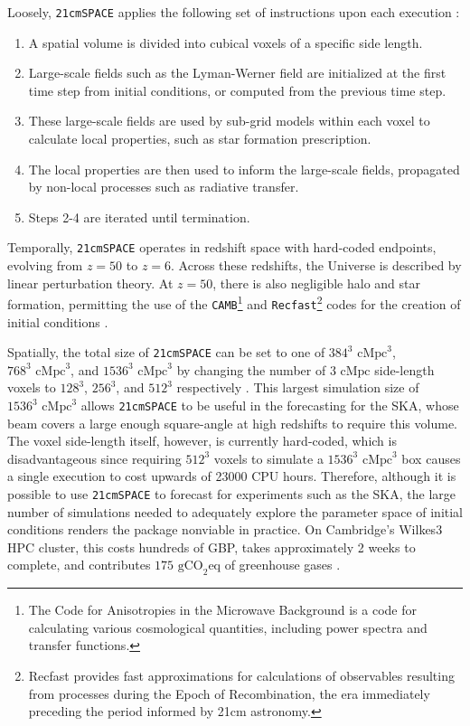 \documentclass[floats,floatfix,showpacs,amssymb,prd,superscriptaddress,nofootinbib]{revtex4-2} %
\newcommand{\code}{\texttt}
\begin{document}
Loosely, \code{21cmSPACE} applies the following set of instructions upon each execution \citep{gessey-jones_thesis}:

\begin{enumerate}
    \item A spatial volume is divided into cubical voxels of a specific side length.

    \item Large-scale fields such as the Lyman-Werner field are initialized at the first time step from initial conditions, or computed from the previous time step.

    \item These large-scale fields are used by sub-grid models within each voxel to calculate local properties, such as star formation prescription.

    \item The local properties are then used to inform the large-scale fields, propagated by non-local processes such as radiative transfer.

    \item Steps 2-4 are iterated until termination.
\end{enumerate}

Temporally, \code{21cmSPACE} operates in redshift space with hard-coded endpoints, evolving from $z = 50$ to $z = 6$. Across these redshifts, the Universe is described by linear perturbation theory. At $z = 50$, there is also negligible halo and star formation, permitting the use of the \code{CAMB}\footnote{The Code for Anisotropies in the Microwave Background is a code for calculating various cosmological quantities, including power spectra and transfer functions.}\citep{Lewis_Challinor_2011} and \code{Recfast}\footnote{Recfast provides fast approximations for calculations of observables resulting from processes during the Epoch of Recombination, the era immediately preceding the period informed by 21cm astronomy.}\citep{Seager_2011} codes for the creation of initial conditions \citep{gessey-jones_thesis}.

Spatially, the total size of \code{21cmSPACE} can be set to one of $384^3 \text{ cMpc}^3$, $768^3 \text{ cMpc}^3$, and $1536^3 \text{ cMpc}^3$ by changing the number of $3 \text{ cMpc}$ side-length voxels to $128^3$, $256^3$, and $512^3$ respectively \citep{dhandha_2022}. This largest simulation size of $1536^3 \text{ cMpc}^3$ allows \code{21cmSPACE} to be useful in the forecasting for the SKA, whose beam covers a large enough square-angle at high redshifts to require this volume. The voxel side-length itself, however, is currently hard-coded, which is disadvantageous since requiring $512^3$ voxels to simulate a $1536^3 \text{ cMpc}^3$ box causes a single execution to cost upwards of 23000 CPU hours. Therefore, although it is possible to use \code{21cmSPACE} to forecast for experiments such as the SKA, the large number of simulations needed to adequately explore the parameter space of initial conditions renders the package nonviable in practice. On Cambridge's Wilkes3 HPC cluster, this costs hundreds of GBP, takes approximately 2 weeks to complete, and contributes $175 \text{ gCO}_2\text{eq}$ of greenhouse gases \citep{dhandha_2022}.
\end{document}
